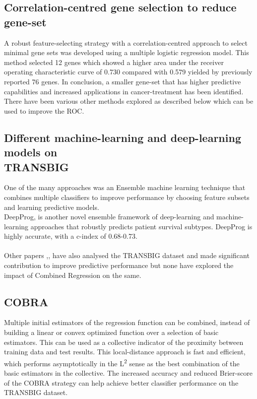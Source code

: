 \documentclass[13pt]{article}
\begin{document}
\subsection{Correlation-centred gene selection to reduce gene-set} 
A robust feature-selecting strategy with a correlation-centred approach to select minimal gene sets was developed using a multiple logistic regression model. This method selected 12 genes which showed a higher area under the receiver operating characteristic curve of 0.730 compared with 0.579 yielded by previously reported 76 genes. In conclusion, a smaller gene-set that has higher predictive capabilities and increased applications in cancer-treatment has been identified. There have been various other methods explored as described below which can be used to improve the ROC.\cite{hikichi2020correlation}

\subsection{Different machine-learning and deep-learning models on \\TRANSBIG} 
One of the many approaches was an Ensemble machine learning technique\cite{zakharov2011ensemble} that combines multiple classifiers to improve performance by choosing feature subsets and learning predictive models. \\
DeepProg\cite{poirion2019multi}, is another novel ensemble framework of deep-learning and machine-learning approaches that robustly predicts patient survival subtypes. DeepProg is highly accurate, with a c-index of 0.68-0.73. \\\\Other papers \cite{djebbari2008ensemble} ,\cite{jiao2015kendall}, \cite{mirsadeghi2019post} have also analysed the TRANSBIG dataset and made significant contribution to improve predictive performance but none have explored the impact of Combined Regression on the same. 

\subsection{COBRA}
Multiple initial estimators of the regression function can be combined, instead of building a linear or convex optimized function over a selection of basic estimators. This can be used as a collective indicator of the proximity between training data and test results. This local-distance approach is fast and efficient, which  performs asymptotically in the L\textsuperscript{2} sense as the best combination of the basic estimators in the collective. The increased accuracy and reduced Brier-score of the COBRA strategy can help achieve better classifier performance on the TRANSBIG dataset.  \cite{biau2016cobra}
\end{document}
